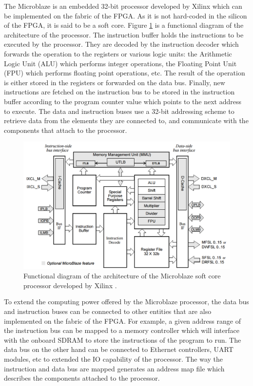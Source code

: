       The Microblaze \cite{Microblaze} is an embedded 32-bit processor developed by Xilinx which can be implemented on the fabric of the FPGA. As it is not hard-coded in the silicon of the FPGA, it is said to be a soft core. Figure \ref{fig:III-1-Microblaze} is a functional diagram of the architecture of the processor. The instruction buffer holds the instructions to be executed by the processor. They are decoded by the instruction decoder which forwards the operation to the registers or various logic units: the Arithmetic Logic Unit (ALU) which performs integer operations, the Floating Point Unit (FPU) which performs floating point operations, etc. The result of the operation is either stored in the registers or forwarded on the data bus. Finally, new instructions are fetched on the instruction bus to be stored in the instruction buffer according to the program counter value which points to the next address to execute. The data and instruction buses use a 32-bit addressing scheme to retrieve data from the elements they are connected to, and communicate with the components that attach to the processor. \\

      \begin{figure}[h!]
        \centering
        \includegraphics[width=\textwidth]{img/III-1-arch/Microblaze.png}
        \caption{Functional diagram of the architecture of the Microblaze soft core processor developed by Xilinx \cite{Microblaze}.}
        \label{fig:III-1-Microblaze}
      \end{figure}

      To extend the computing power offered by the Microblaze processor, the data bus and instruction buses can be connected to other entities that are also implemented on the fabric of the FPGA. For example, a given address range of the instruction bus can be mapped to a memory controller which will interface with the onboard SDRAM to store the instructions of the program to run. The data bus on the other hand can be connected to Ethernet controllers, UART modules, etc to extended the IO capability of the processor. The way the instruction and data bus are mapped generates an address map file which describes the components attached to the processor. \\

